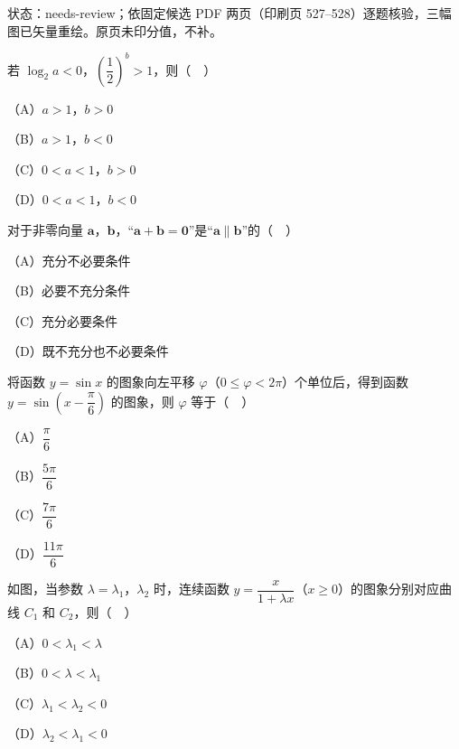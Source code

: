 

状态：needs-review；依固定候选 PDF 两页（印刷页 527–528）逐题核验，三幅图已矢量重绘。原页未印分值，不补。


\begin{question}
若 $\log_2 a<0$，$\left(\dfrac12\right)^b>1$，则（　）

（A）$a>1$，$b>0$

（B）$a>1$，$b<0$

（C）$0<a<1$，$b>0$

（D）$0<a<1$，$b<0$

\end{question}
\begin{question}
对于非零向量 $\boldsymbol a$，$\boldsymbol b$，“$\boldsymbol a+\boldsymbol b=\boldsymbol 0$”是“$\boldsymbol a\parallel\boldsymbol b$”的（　）

（A）充分不必要条件

（B）必要不充分条件

（C）充分必要条件

（D）既不充分也不必要条件

\end{question}
\begin{question}
将函数 $y=\sin x$ 的图象向左平移 $\varphi$（$0\leqslant\varphi<2\pi$）个单位后，得到函数 $y=\sin\left(x-\dfrac\pi6\right)$ 的图象，则 $\varphi$ 等于（　）

（A）$\dfrac\pi6$

（B）$\dfrac{5\pi}6$

（C）$\dfrac{7\pi}6$

（D）$\dfrac{11\pi}6$

\Needspace{0.4\textheight}
\end{question}
\begingroup
\renewenvironment{question}{\Needspace{0.5\textheight}}{}
\begin{question}
如图，当参数 $\lambda=\lambda_1$，$\lambda_2$ 时，连续函数 $y=\dfrac{x}{1+\lambda x}$（$x\geqslant0$）的图象分别对应曲线 $C_1$ 和 $C_2$，则（　）

（A）$0<\lambda_1<\lambda$

（B）$0<\lambda<\lambda_1$

（C）$\lambda_1<\lambda_2<0$

（D）$\lambda_2<\lambda_1<0$
\nopagebreak[4]
\begin{center}\end{center}
\nopagebreak[4]
\end{question}
